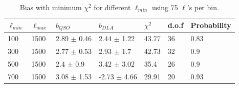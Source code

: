 \documentclass{amsart}
\begin{document}
\begin{center}
\begin{table}[htbp]
\caption{Bias with minimum $\chi^2$  for different $\ell_{min}$ using 75 $\ell$'s per bin.}
\begin{tabular}{p{}p{}p{}p{}p{}p{}p{}} \\ \toprule
$\ell_{min}$ & $\ell_{max}$ & \multicolumn{1}{p{0cm}}{$b_{QSO}$} & $b_{DLA}$ & \multicolumn{1}{p{2cm}}{$\chi^2$} & d.o.f  & Probability\\ \midrule
100  &  1500  &  2.89  $\pm$  0.46  &  2.44  $\pm$  1.22  &  43.77  &  36  &  0.83 \\
300  &  1500  &  2.77  $\pm$  0.53  &  2.93  $\pm$  1.7  &  42.73  &  32  &  0.9 \\
500  &  1500  &  2.4  $\pm$  0.9  &  3.42  $\pm$  3.02  &  35.4  &  26  &  0.9 \\
700  &  1500  &  3.08  $\pm$  1.53  &  -2.73  $\pm$  4.66  &  29.91  &  20  &  0.93 \\
 \bottomrule
\end{tabular}

\end{table}
\end{center}
\end{document}
